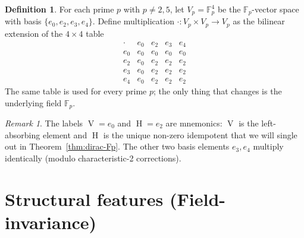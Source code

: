 \documentclass[11pt,reqno]{amsart}
\theoremstyle{plain}
\theoremstyle{definition}
\newtheorem{definition}[theorem]{Definition}
\theoremstyle{remark}
\newtheorem*{remark}{Remark}
\newcommand{\F}{\mathbb{F}}
\DeclareMathOperator{\HARM}{H}
\DeclareMathOperator{\VOID}{V}
\begin{document}
\begin{definition}\label{def:V-Fp}
For each prime $p$ with $p \neq 2, 5$, let $V_p = \F_p^4$ be the
$\F_p$-vector space with basis $\{e_0, e_2, e_3, e_4\}$. Define
multiplication $\cdot: V_p \times V_p \to V_p$ as the bilinear extension
of the $4 \times 4$ table
\[
\begin{array}{c|cccc}
\cdot & e_0 & e_2 & e_3 & e_4 \\ \hline
e_0 & e_0 & e_0 & e_0 & e_0 \\
e_2 & e_0 & e_2 & e_2 & e_2 \\
e_3 & e_0 & e_2 & e_2 & e_2 \\
e_4 & e_0 & e_2 & e_2 & e_2
\end{array}
\]
The same table is used for every prime $p$; the only thing that changes
is the underlying field $\F_p$.
\end{definition}

\begin{remark}
The labels $\VOID = e_0$ and $\HARM = e_2$ are mnemonics: $\VOID$ is the
left-absorbing element and $\HARM$ is the unique non-zero idempotent
that we will single out in Theorem~\ref{thm:dirac-Fp}. The other two
basis elements $e_3, e_4$ multiply identically (modulo
characteristic-2 corrections).
\end{remark}

\section{Structural features (Field-invariance)}
\end{document}
